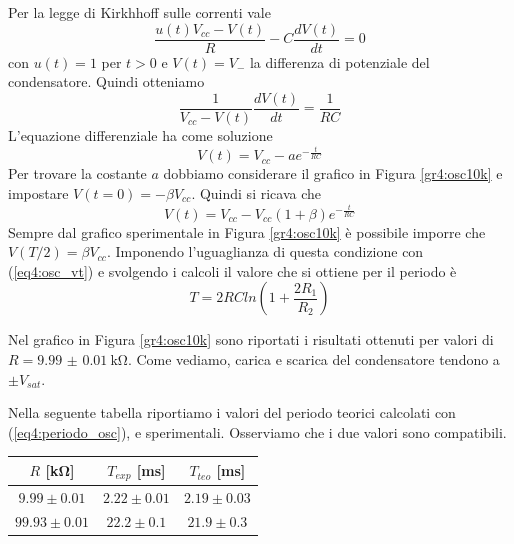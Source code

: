 Per la legge di Kirkhhoff sulle correnti vale
$$\frac{u(t)V_{cc} - V(t)}{R} - C \frac{dV(t)}{dt} = 0$$
con $u(t)=1$ per $t>0$ e $V(t)=V_-$ la differenza di potenziale del condensatore. Quindi otteniamo
$$\frac{1}{V_{cc} - V(t)} \frac{dV(t)}{dt} = \frac{1}{RC}$$
L'equazione differenziale ha come soluzione
$$V(t)=V_{cc} - a e^{-\frac{t}{RC}}$$
Per trovare la costante $a$ dobbiamo considerare il grafico in Figura \ref{gr4:osc10k} e impostare $V(t=0)=-\beta V_{cc}$. Quindi si ricava che
\begin{equation}
V(t)=V_{cc} - V_{cc} (1+ \beta) e^{-\frac{t}{RC}}
\label{eq4:osc_vt}
\end{equation}
Sempre dal grafico sperimentale in Figura \ref{gr4:osc10k} è possibile imporre che $V(T/2)=\beta V_{cc}$. Imponendo l'uguaglianza di questa condizione con (\ref{eq4:osc_vt}) e svolgendo i calcoli il valore che si ottiene per il periodo è
\begin{equation}
T=2RCln\left(1+\frac{2R_1}{R_2}\right)
\label{eq4:periodo_osc}
\end{equation}  

Nel grafico in Figura \ref{gr4:osc10k} sono riportati i risultati ottenuti per valori di $R=\SI{9.99(1)}{\kohm}$. Come vediamo, carica e scarica del condensatore tendono a $\pm V_{sat}$.

Nella seguente tabella riportiamo i valori del periodo teorici calcolati con (\ref{eq4:periodo_osc}), e sperimentali. Osserviamo che i due valori sono compatibili.

\begin{center}
{\renewcommand{\arraystretch}{1.2}%
	\begin{tabular}{c|c|c}
	$R$ [\si{\kilo\ohm}] & $T_{exp}$ [\si{\milli\second}] & $T_{teo}$ [\si{\milli\second}]\\
    \hline
	$9.99\pm0.01 $ & $2.22\pm0.01$ & $2.19 \pm 0.03$\\
    \hline
	$99.93\pm0.01 $ & $22.2\pm0.1$ & $21.9 \pm 0.3$\\
	\end{tabular}
}
\end{center}


